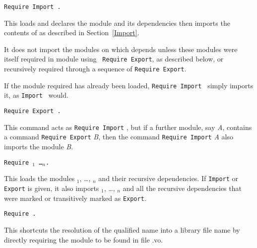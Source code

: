 \begin{Variants}
\item {\tt Require Import {\qualid}.}  

  This loads and declares the module {\qualid} and its dependencies
  then imports the contents of {\qualid} as described in
  Section~\ref{Import}.

  It does not import the modules on which {\qualid} depends unless
  these modules were itself required in module {\qualid} using {\tt
  Require Export}, as described below, or recursively required through
  a sequence of {\tt Require Export}.

  If the module required has already been loaded, {\tt Require Import
  {\qualid}} simply imports it, as {\tt Import {\qualid}} would.

\item {\tt Require Export {\qualid}.}

  This command acts as {\tt Require Import} {\qualid}, but if a
  further module, say {\it A}, contains a command {\tt Require
  Export} {\it B}, then the command {\tt Require Import} {\it A}
  also imports the module {\it B}.

\item {\tt Require  {\qualid}$_1$ \ldots {\qualid}$_n$.}

  This loads the modules {\qualid}$_1$, \ldots, {\qualid}$_n$ and
  their recursive dependencies. If {\tt Import} or {\tt Export} is
  given, it also imports {\qualid}$_1$, \ldots, {\qualid}$_n$ and all
  the recursive dependencies that were marked or transitively marked
  as {\tt Export}.

\item {\tt Require  {\str}.}

  This shortcuts the resolution of the qualified name into a library
  file name by directly requiring the module to be found in file
  {\str}.vo.
\end{Variants}

